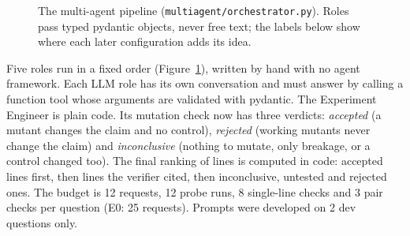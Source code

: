 \documentclass[10pt,a4paper]{article}
\newcommand{\code}[1]{\texttt{\small #1}}
\begin{document}
\begin{figure}[!htb]
\centering
{}
\caption{The multi-agent pipeline (\code{multiagent/orchestrator.py}). Roles pass typed pydantic objects, never free
text; the labels below show where each later configuration adds its idea.}
\label{fig:roles}
\end{figure}

Five roles run in a fixed order (Figure~\ref{fig:roles}), written by hand with no agent framework. Each LLM role has its
own conversation and must answer by calling a function tool whose arguments are validated with pydantic. The
Experiment Engineer is plain code. Its mutation check now has three verdicts: \emph{accepted} (a mutant changes the
claim and no control), \emph{rejected} (working mutants never change the claim) and \emph{inconclusive} (nothing to
mutate, only breakage, or a control changed too). The final ranking of lines is computed in code: accepted lines first,
then lines the verifier cited, then inconclusive, untested and rejected ones. The budget is 12 requests, 12 probe runs,
8 single-line checks and 3 pair checks per question (E0: 25 requests). Prompts were developed on 2 dev questions only.
\end{document}
